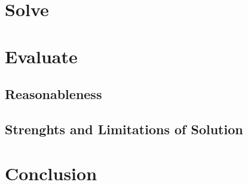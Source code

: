 \documentclass[11pt, letterpaper]{article}
\begin{document}
\section{Solve}


\section{Evaluate}



\subsection{Reasonableness}


\subsection{Strenghts and Limitations of Solution}


\section{Conclusion}


 
\end{document}
